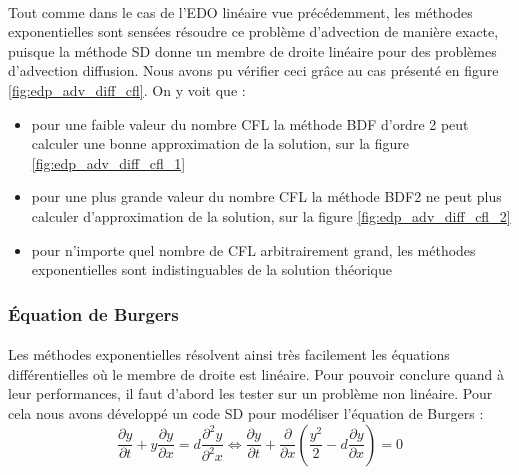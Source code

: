     \paragraph{}
    Tout comme dans le cas de l'EDO linéaire vue précédemment, les méthodes exponentielles sont sensées résoudre ce problème d'advection de manière exacte, puisque la méthode SD donne un membre de droite linéaire pour des problèmes d'advection diffusion. Nous avons pu vérifier ceci grâce au cas présenté en figure \ref{fig:edp_adv_diff_cfl}. On y voit que :
    \begin{itemize}
        \item pour une faible valeur du nombre CFL la méthode BDF d'ordre 2 peut calculer une bonne approximation de la solution, sur la figure \ref{fig:edp_adv_diff_cfl_1}
        \item pour une plus grande valeur du nombre CFL la méthode BDF2 ne peut plus calculer d'approximation de la solution, sur la figure \ref{fig:edp_adv_diff_cfl_2}
        \item pour n'importe quel nombre de CFL arbitrairement grand, les méthodes exponentielles sont indistinguables de la solution théorique
    \end{itemize}
    
    \subsubsection{Équation de Burgers}
    \paragraph{}
    Les méthodes exponentielles résolvent ainsi très facilement les équations différentielles où le membre de droite est linéaire. Pour pouvoir conclure quand à leur performances, il faut d'abord les tester sur un problème non linéaire. Pour cela nous avons développé un code SD pour modéliser l'équation de Burgers :
    \begin{equation}
        \frac{\partial y}{\partial t} + y\frac{\partial y}{\partial x} = d\frac{\partial^2 y}{\partial^2 x}
        \Longleftrightarrow \frac{\partial y}{\partial t} + \frac{\partial}{\partial x}\left(\frac{y^2}{2} - d\frac{\partial y}{\partial x}\right) = 0
    \label{eq:burgers}
    \end{equation}
    
